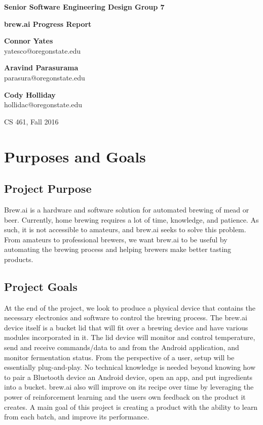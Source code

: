 \documentclass[draftclsnofoot,onecolumn,letterpaper,10pt]{IEEEtran}
\begin{document}
\begin{center}
	{\huge\textbf{Senior Software Engineering Design Group 7}}
	\vspace{1cm}

	{\Huge\textbf{brew.ai Progress Report}}

	\vspace{2cm}
	\textbf{Connor Yates}\\yatesco@oregonstate.edu

	\textbf{Aravind Parasurama}\\parasura@oregonstate.edu

	\textbf{Cody Holliday}\\hollidac@oregonstate.edu

	\vspace{2cm}
	{\Large CS 461, Fall 2016}
	\vspace{1cm}
\end{center}

\begin{abstract}

\end{abstract}

\newpage
\tableofcontents
\newpage

\section{Purposes and Goals}%
\subsection{Project Purpose}
Brew.ai is a hardware and software solution for automated brewing of mead or beer.
Currently, home brewing requires a lot of time, knowledge, and patience. 
As such, it is not accessible to amateurs, and brew.ai seeks to solve this problem. 
From amateurs to professional brewers, we want brew.ai to be useful by automating the brewing process and helping brewers make better tasting products. 

\subsection{Project Goals}
At the end of the project, we look to produce a physical device that contains the necessary electronics and software to control the brewing process.
The brew.ai device itself is a bucket lid that will fit over a brewing device and have various modules incorporated in it. 
The lid device will monitor and control temperature, send and receive commands/data to and from the Android application, and monitor fermentation status.
From the perspective of a user, setup will be essentially plug-and-play. 
No technical knowledge is needed beyond knowing how to pair a Bluetooth device an Android device, open an app, and put ingredients into a bucket.
brew.ai also will improve on its recipe over time by leveraging the power of reinforcement learning and the users own feedback on the product it creates.
A main goal of this project is creating a product with the ability to learn from each batch, and improve its performance.
\end{document}
